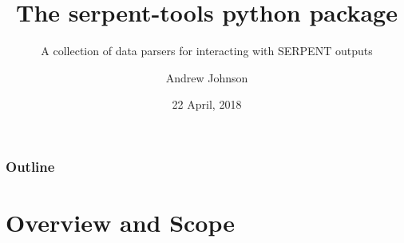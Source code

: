 %
%
%


\title{The serpent-tools python package}
\subtitle{A collection of data parsers for interacting with SERPENT outputs}
\author{Andrew Johnson}
\date{22 April, 2018}

\newcommand{\sss}{\texttt{SERPENT }}
\newcommand{\colShare}{0.48\textwidth}

\newcommand{\backupbegin}{
       \newcounter{framenumberappendix}
          \setcounter{framenumberappendix}{\value{framenumber}}
      }
\newcommand{\backupend}{
     \addtocounter{framenumberappendix}{-\value{framenumber}}
        \addtocounter{framenumber}{\value{framenumberappendix}} 
    }  

\hypersetup{colorlinks,linkcolor=,urlcolor=links}
\newcommand{\toapi}[3]{\href{https://serpent-tools.readthedocs.io/en/latest/api/#1.html\##2.#3}{\texttt{#3}}}
\newcommand{\github}[1]{\url{https://github.com/CORE-GATECH-GROUP/serpent-tools/#1}}
\newcommand{\repo}{\url{https://github.com/CORE-GATECH-GROUP/physor18-serpentToolsDemo}}


\begin{frame}
\titlepage
\end{frame}

\begin{frame}
\frametitle{Outline}
\tableofcontents
\end{frame}

\section{Overview and Scope}

